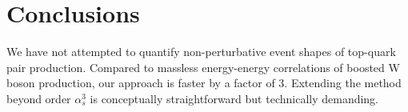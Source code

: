 \section{Conclusions}\label{sec:conclusions}

We have not attempted to quantify non-perturbative event shapes of
top-quark pair production. Compared to massless energy-energy
correlations of boosted W boson production, our approach is faster by a
factor of 3. Extending the method beyond order $\alpha_s^3$ is
conceptually straightforward but technically demanding.

